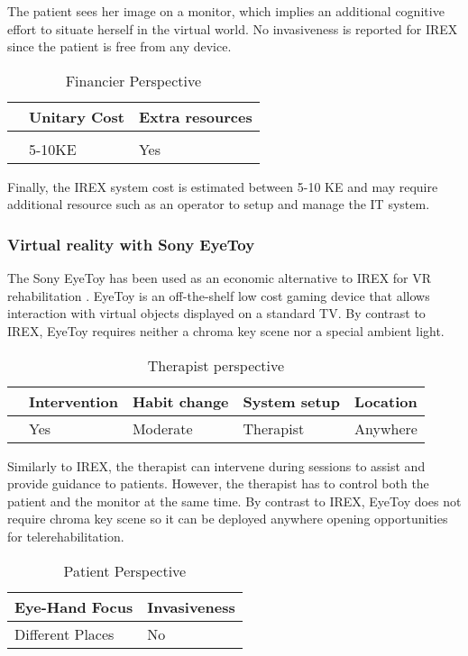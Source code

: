 \documentclass[preprint,authoryear,12pt]{elsarticle}
\begin{document}
The patient sees her image on a monitor, which implies an additional cognitive effort to situate herself in the virtual world. No invasiveness is reported for IREX since the patient is free from any device.

\begin{table}[h]
\caption{Financier Perspective}
\center
\label{tab:finaper}
\begin{tabular}{|l|l|l|}
\hline
& Unitary Cost & Extra resources \\
\hline
\citep{Kizony2005} & &\\
\citep{Reid2004}& 5-10KE	 &  Yes\\
\hline
\end{tabular}
\end{table}

Finally, the IREX system cost is estimated between 5-10 KE and may require additional resource such as an operator to setup and manage the IT system.

\par
\subsubsection{Virtual reality with Sony EyeToy}

The Sony EyeToy has been used as an economic alternative to IREX for VR rehabilitation \citep{Rand2004}. EyeToy is an off-the-shelf low cost gaming device that allows interaction with virtual objects displayed on a standard TV. By contrast to IREX, EyeToy requires neither a chroma key scene nor a special ambient light.

\begin{table}[h]
\caption{Therapist perspective}
\center
\label{tab:theraper}
\begin{tabular}{|l|l|l|l|l|}
\hline
& Intervention & Habit change & System setup &	Location \\
\hline
\citep{Rand2004} & Yes &  Moderate	 & Therapist	 & Anywhere\\
\hline
\end{tabular}
\end{table}

Similarly to IREX, the therapist can intervene during sessions to assist and provide guidance to patients. However, the therapist has to control both the patient and the monitor at the same time. By contrast to IREX, EyeToy does not require chroma key scene so it can be deployed anywhere opening opportunities for telerehabilitation.

\begin{table}[h]
\caption{Patient Perspective}
\center
\label{tab:pataper}
\begin{tabular}{|l|l|}
\hline
 Eye-Hand  Focus & Invasiveness \\
\hline
Different Places &  No\\
\hline
\end{tabular}
\end{table}
\end{document}
